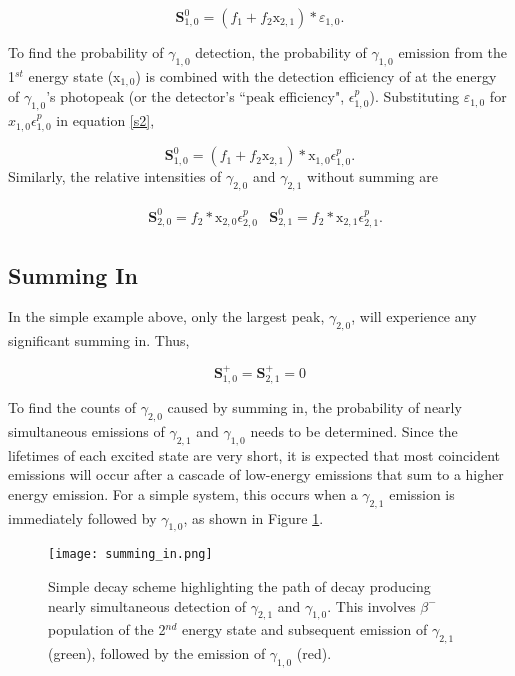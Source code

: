 \documentclass[12pt,twoside]{reedthesis}
\begin{document}
\begin{equation}
\textbf{S}_{1,0}^{0} = (f_{1} + f_{2} \text{x}_{2,1}) * \varepsilon_{1,0}.
\label{s2}
\end{equation} 

To find the probability of $\gamma_{1,0}$ detection, the probability of $\gamma_{1,0}$ emission from the 1$^{st}$ energy state (x$_{1,0}$) is combined with the detection efficiency of at the energy of $\gamma_{1,0}$'s photopeak (or the detector's ``peak efficiency", $\epsilon^{p}_{1,0}$). Substituting $\varepsilon_{1,0}$ for $x_{1,0} \epsilon^{p}_{1,0}$ in equation \ref{s2},

\begin{equation}
\textbf{S}_{1,0}^{0} = (f_{1} + f_{2} \text{x}_{2,1}) * \text{x}_{1,0} \epsilon^{p}_{1,0}.
\label{s3}
\end{equation} 
Similarly, the relative intensities of $\gamma_{2,0}$ and $\gamma_{2,1}$ without summing are 

\begin{align}
&\textbf{S}_{2,0}^{0} = f_{2} * \text{x}_{2,0} \epsilon^{p}_{2,0}
&\textbf{S}_{2,1}^{0} = f_{2} * \text{x}_{2,1} \epsilon^{p}_{2,1}.
\label{probs}
\end{align}

\subsection{Summing In}

In the simple example above, only the largest peak, $\gamma_{2,0}$, will experience any significant summing in. Thus, 

\begin{equation}
\textbf{S}_{1,0}^{+} = \textbf{S}_{2,1}^{+} = 0
\label{s+}
\end{equation}

To find the counts of $\gamma_{2,0}$ caused by summing in, the probability of nearly simultaneous emissions of $\gamma_{2,1}$ and $\gamma_{1,0}$ needs to be determined. Since the lifetimes of each excited state are very short, it is expected that most coincident emissions will occur after a cascade of low-energy emissions that sum to a higher energy emission. For a simple system, this occurs when a $\gamma_{2,1}$ emission is immediately followed by $\gamma_{1,0}$, as shown in Figure \ref{sum_in}. 

 \begin{figure}[h!]
	\centering
	\texttt{[image: summing\_in.png]}
	\caption{Simple decay scheme highlighting the path of decay producing nearly simultaneous detection of $\gamma_{2,1}$ and $\gamma_{1,0}$. This involves $\beta^{-}$ population of the 2$^{nd}$ energy state and subsequent emission of $\gamma_{2,1}$ (green), followed by the emission of $\gamma_{1,0}$ (red).}
\label{sum_in}
\end{figure}
\end{document}
